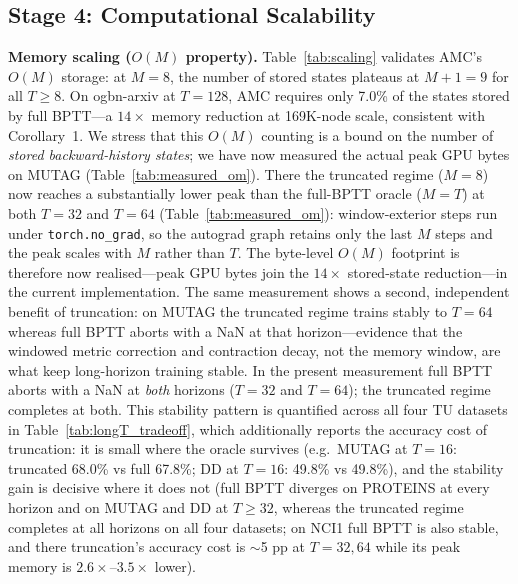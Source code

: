 \documentclass[a4paper,fleqn]{cas-dc}
\begin{document}
\subsection{Stage 4: Computational Scalability}

\textbf{Memory scaling ($O(M)$ property).} Table~\ref{tab:scaling} validates AMC's $O(M)$ storage: at $M{=}8$, the number of stored states plateaus at $M{+}1{=}9$ for all $T \geq 8$. On ogbn-arxiv at $T{=}128$, AMC requires only 7.0\% of the states stored by full BPTT---a $14\times$ memory reduction at 169K-node scale, consistent with Corollary~1. We stress that this $O(M)$ counting is a bound on the number of \emph{stored backward-history states}; we have now measured the actual peak GPU bytes on MUTAG (Table~\ref{tab:measured_om}). There the truncated regime ($M{=}8$) now reaches a substantially lower peak than the full-BPTT oracle ($M{=}T$) at both $T{=}32$ and $T{=}64$ (Table~\ref{tab:measured_om}): window-exterior steps run under \texttt{torch.no\_grad}, so the autograd graph retains only the last $M$ steps and the peak scales with $M$ rather than $T$. The byte-level $O(M)$ footprint is therefore now realised---peak GPU bytes join the $14\times$ stored-state reduction---in the current implementation. The same measurement shows a second, independent benefit of truncation: on MUTAG the truncated regime trains stably to $T{=}64$ whereas full BPTT aborts with a NaN at that horizon---evidence that the windowed metric correction and contraction decay, not the memory window, are what keep long-horizon training stable. In the present measurement full BPTT aborts with a NaN at \emph{both} horizons ($T{=}32$ and $T{=}64$); the truncated regime completes at both. This stability pattern is quantified across all four TU datasets in Table~\ref{tab:longT_tradeoff}, which additionally reports the accuracy cost of truncation: it is small where the oracle survives (e.g.\ MUTAG at $T{=}16$: truncated 68.0\% vs full 67.8\%; DD at $T{=}16$: 49.8\% vs 49.8\%), and the stability gain is decisive where it does not (full BPTT diverges on PROTEINS at every horizon and on MUTAG and DD at $T{\ge}32$, whereas the truncated regime completes at all horizons on all four datasets; on NCI1 full BPTT is also stable, and there truncation's accuracy cost is $\sim$5 pp at $T{=}32,64$ while its peak memory is $2.6\times$--$3.5\times$ lower).
\end{document}
